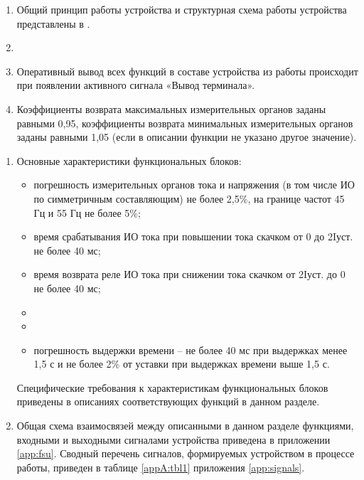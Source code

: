\begin{enumerate}
\item Общий принцип работы устройства и структурная схема работы устройства представлены в \ManualUnitGeneral.
\item {}
\item Оперативный вывод всех функций в составе устройства из работы происходит при появлении активного сигнала «Вывод терминала».
\item Коэффициенты возврата максимальных измерительных органов заданы равными 0,95, коэффициенты возврата минимальных измерительных органов заданы равными 1,05 (если в описании функции не указано другое значение).
\end{enumerate}


\begin{enumerate}[resume]
\item Основные характеристики функциональных блоков:
\begin{itemize}
    \item погрешность измерительных органов тока и напряжения (в том числе ИО по симметричным составляющим) не более 2,5\%, на границе частот 45 Гц и 55 Гц не более 5\%;
    \item время срабатывания ИО тока при повышении тока скачком от 0 до 2Iуст. не более 40 мс;
    \item время возврата реле ИО тока при снижении тока скачком от 2Iуст. до 0 не более 40 мс;
    \item {}
    \item {}
    \item погрешность выдержки времени -- не более 40 мс при выдержках менее 1,5 с и не более 2\% от уставки при выдержках времени выше 1,5 с.
\end{itemize}
Специфические требования к характеристикам функциональных блоков приведены в описаниях соответствующих функций в данном разделе.
\item Общая схема взаимосвязей между описанными в данном разделе функциями, входными и выходными сигналами устройства приведена в приложении \ref{app:fsu}. Сводный перечень сигналов, формируемых устройством в процессе работы, приведен в таблице \ref{appA:tbl1} приложения \ref{app:signals}.
\end{enumerate}